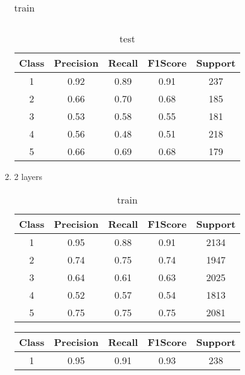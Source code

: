 \begin{enumerate}[label=(\alph*)]
\begin{enumerate}[label=\roman*.]
\begin{table}[!htb]
\begin{tabular}{ccccc}
            \end{tabular}
            \caption{train}
            \label{part e train depth 1}
        \end{table}
        \begin{table}[!htb]
            \centering
            \begin{tabular}{ccccc}
            \hline
            Class & Precision & Recall & F1Score & Support \\ \hline
            1     & 0.92      & 0.89   & 0.91    & 237     \\
            2     & 0.66      & 0.70   & 0.68    & 185     \\
            3     & 0.53      & 0.58   & 0.55    & 181     \\
            4     & 0.56      & 0.48   & 0.51    & 218     \\
            5     & 0.66      & 0.69   & 0.68    & 179     \\ \hline
            \end{tabular}
            \caption{test}
            \label{part e test depth 1}
        \end{table}
        \newpage
        \item 2 layers
        \begin{table}[!htb]
            \centering
            \begin{tabular}{ccccc}
            \hline
            Class & Precision & Recall & F1Score & Support \\ \hline
            1     & 0.95      & 0.88   & 0.91    & 2134    \\
            2     & 0.74      & 0.75   & 0.74    & 1947    \\
            3     & 0.64      & 0.61   & 0.63    & 2025    \\
            4     & 0.52      & 0.57   & 0.54    & 1813    \\
            5     & 0.75      & 0.75   & 0.75    & 2081    \\ \hline
            \end{tabular}
            \caption{train}
            \label{part e train depth 2}
        \end{table}
        \begin{table}[!htb]
            \centering
            \begin{tabular}{ccccc}
            \hline
            Class & Precision & Recall & F1Score & Support \\ \hline
            1     & 0.95      & 0.91   & 0.93    & 238     \\

\end{tabular}
\end{table}
\end{enumerate}
\end{enumerate}
